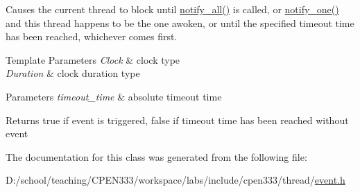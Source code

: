 Causes the current thread to block until {\ttfamily \hyperlink{classcpen333_1_1thread_1_1event_ac41756fc84760cd537c78de31b3b25fa}{notify\+\_\+all()}} is called, or {\ttfamily \hyperlink{classcpen333_1_1thread_1_1event_a453552a68dff5c45321496e452495364}{notify\+\_\+one()}} and this thread happens to be the one awoken, or until the specified timeout time has been reached, whichever comes first.


\begin{DoxyTemplParams}{Template Parameters}
{\em Clock} & clock type \\
\hline
{\em Duration} & clock duration type \\
\hline
\end{DoxyTemplParams}

\begin{DoxyParams}{Parameters}
{\em timeout\+\_\+time} & absolute timeout time \\
\hline
\end{DoxyParams}
\begin{DoxyReturn}{Returns}
{\ttfamily true} if event is triggered, {\ttfamily false} if timeout time has been reached without event 
\end{DoxyReturn}


The documentation for this class was generated from the following file\+:\begin{DoxyCompactItemize}
\item 
D\+:/school/teaching/\+C\+P\+E\+N333/workspace/labs/include/cpen333/thread/\hyperlink{thread_2event_8h}{event.\+h}\end{DoxyCompactItemize}
